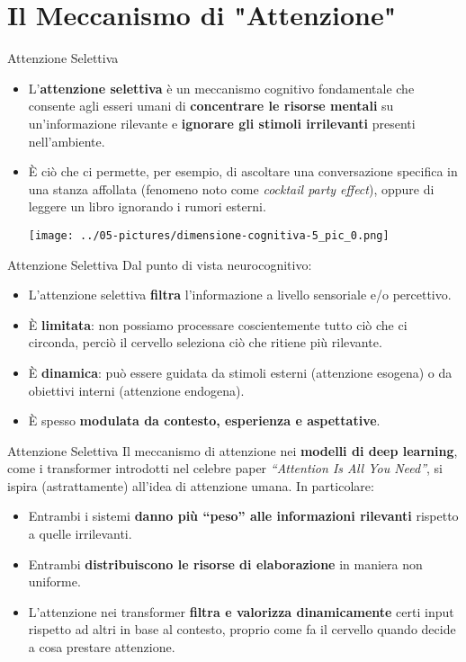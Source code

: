 \documentclass[aspectratio=169]{beamer}
\begin{document}
\section{Il Meccanismo di "Attenzione"}
%
%
\begin{frame}{Attenzione Selettiva}
\begin{itemize}
\item    L'\textbf{attenzione selettiva} è un meccanismo cognitivo fondamentale
che consente agli esseri umani di \textbf{concentrare le risorse
mentali} su un'informazione rilevante e \textbf{ignorare gli stimoli
irrilevanti} presenti nell'ambiente. 
\item È ciò che ci permette, per esempio,
di ascoltare una conversazione specifica in una stanza affollata
(fenomeno noto come \emph{cocktail party effect}), oppure di leggere un
libro ignorando i rumori esterni.
\begin{center}
\texttt{[image: ../05-pictures/dimensione-cognitiva-5\_pic\_0.png]} 
\end{center}
\end{itemize}
\end{frame}
%
%
\begin{frame}{Attenzione Selettiva}
Dal punto di vista neurocognitivo:
\vspace{.3cm}
\begin{itemize}
\item
  L'attenzione selettiva \textbf{filtra} l'informazione a livello
  sensoriale e/o percettivo.
\item
  È \textbf{limitata}: non possiamo processare coscientemente tutto ciò
  che ci circonda, perciò il cervello seleziona ciò che ritiene più
  rilevante.
\item
  È \textbf{dinamica}: può essere guidata da stimoli esterni (attenzione
  esogena) o da obiettivi interni (attenzione endogena).
\item
  È spesso \textbf{modulata da contesto, esperienza e aspettative}.
\end{itemize}
\end{frame}
%
%
\begin{frame}{Attenzione Selettiva}
Il meccanismo di attenzione nei \textbf{modelli di deep learning}, come
i transformer introdotti nel celebre paper \emph{``Attention Is All You
Need''}, si ispira (astrattamente) all'idea di attenzione umana. In
particolare:

\begin{itemize}
\item
  Entrambi i sistemi \textbf{danno più ``peso'' alle informazioni
  rilevanti} rispetto a quelle irrilevanti.
\item
  Entrambi \textbf{distribuiscono le risorse di elaborazione} in maniera
  non uniforme.
\item
  L'attenzione nei transformer \textbf{filtra e valorizza dinamicamente}
  certi input rispetto ad altri in base al contesto, proprio come fa il
  cervello quando decide a cosa prestare attenzione.
\end{itemize}
\end{frame}
\end{document}
